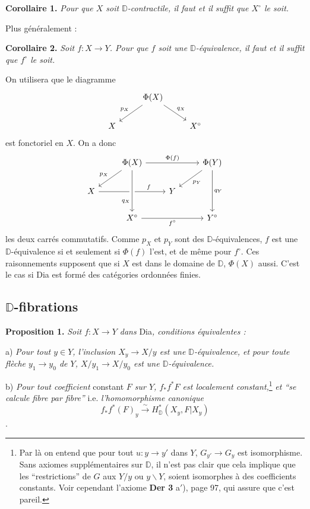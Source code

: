 \documentclass[11pt]{article}
\newcommand{\printedpage}[1]{\marginpar{\footnotesize p.~#1}}
\newcommand{\msp}[1]{\marginpar{\footnotesize [#1]}}
\newcommand{\D}{\mathbb{D}}
\newcommand{\Dia}{\textsf{Dia}}
\newcommand{\bs}{\backslash}
\begin{document}
\textbf{Corollaire 1.} \textit{Pour que $X$ soit $\D$-contractile, il faut et il suffit que $X^\circ$ le soit.}

\hspace*{\parindent}Plus généralement :

\textbf{Corollaire 2.} \textit{Soit $f : X \to Y$. Pour que $f$ soit une $\D$-équivalence, il faut et il suffit que $f^\circ$ le soit.}

\hspace*{\parindent}On utilisera que le diagramme
\[
\begin{tikzcd}
& \Phi(X) \arrow[dl, "p_X"'] \arrow[dr, "q_X"] & \\
X & & X^\circ
\end{tikzcd}
\]
est fonctoriel en $X$. On a donc
\[
\begin{tikzcd}
& \Phi(X) \arrow[rr, "\Phi(f)"] \arrow[dl, "p_X"'] & & \Phi(Y) \arrow[dl, "p_Y"] \arrow[dd, "q_Y"] \\
X \arrow[rr, "f" near end] \arrow[from=1-2, to=3-2, "q_X"' near end, crossing over] & & Y & \\
& X^\circ \arrow[rr, "f^\circ"'] & & Y^\circ
\end{tikzcd}
\]
les deux carrés commutatifs. Comme $p_X$ et $p_Y$ sont des $\D$-équivalences, $f$ est une $\D$-équivalence si et seulement si $\Phi(f)$ l'est, et de même pour $f^\circ$. Ces raisonnements supposent que si $X$ est dans le domaine de $\D$, $\Phi(X)$ aussi. C'est le cas si \Dia{} est formé des catégories ordonnées finies.

\printedpage{46}
\msp{page 76}

\subsection*{$\D$-fibrations}

\textbf{Proposition 1.} \textit{Soit $f : X \to Y$ dans} \Dia\textit{, conditions équivalentes :}

\hspace*{\parindent}a) \textit{Pour tout $y \in Y$, l'inclusion $X_y \to X/y$ est une $\D$-équivalence, et pour toute flèche $y_1 \to y_0$ de $Y$, $X/y_1 \to X/y_0$ est une $\D$-équivalence.}

\hspace*{\parindent}b) \textit{Pour tout coefficient} constant \textit{$F$ sur $Y$, $f_*f^*F$ est localement constant,}\footnote[33]{Par là on entend que pour tout $u : y \to y'$ dans $Y$, $G_{y'} \to G_y$ est isomorphisme. Sans axiomes supplémentaires sur $\D$, il n'est pas clair que cela implique que les ``restrictions'' de $G$ aux $Y/y$ ou $y\bs Y$, soient isomorphes à des coefficients constants. Voir cependant l'axiome \textbf{Der 3} a$'$), page 97, qui assure que c'est pareil.} \textit{et ``se calcule fibre par fibre''} i.e. \textit{l'homomorphisme canonique}
\[
f_*f^*(F)_y \overset{\sim}{\longrightarrow} H^*_{\D}(X_y, F|X_y)
\]
.
\end{document}
